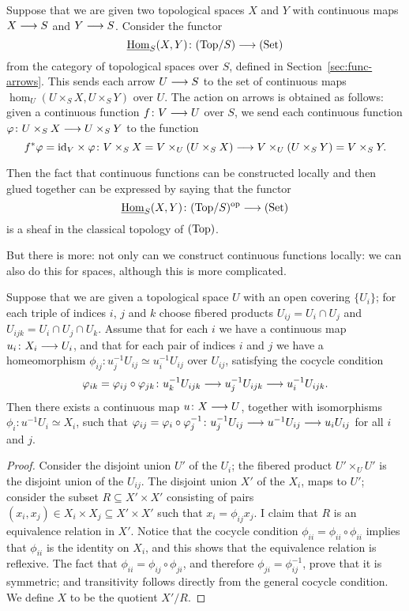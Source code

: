 \begin{4   STACKS}
\begin{4.1 Descent of objects of fibcats}
Suppose that we are given two topological spaces $X$ and $Y$ with continuous maps $X \arr S$ and $Y \arr S$. Consider the functor
   \[
   \underhom_S(X, Y) \colon \catover{Top}{S} \arr \catset
   \]
from the category of topological spaces over $S$, defined in Section~\ref{sec:func-arrows}. This sends each arrow $U \arr S$ to the set of continuous maps $\hom_U(U \times_S X, U \times_S Y)$ over $U$. The action on arrows is obtained as follows: given a continuous function $f \colon V \arr U$ over $S$, we send each continuous function $\phi \colon U \times_S X \arr U \times_S Y$ to the function
   \[
   f^* \phi = \id_V \times \phi \colon V
   \times_S X = V \times_U(U \times_S X) \arr V \times_U(U
   \times_S Y) = V \times_S Y.
   \]

Then the fact that continuous functions can be constructed locally and then glued together can be expressed by saying that the functor
   \[
   \underhom_S(X, Y) \colon \catover{Top}{S}
   \op \arr \catset
   \]
is a sheaf in the classical topology of $(\mathrm{Top})$.

But there is more: not only can we construct continuous functions locally: we can also do this for spaces, although this is more complicated.

\begin{proposition}\label{prop:gluing-top}
Suppose that we are given a topological space $U$ with an open covering $\{U_i\}$; for each triple of indices $i$, $j$ and $k$ choose fibered products $U_{ij} = U_i \cap U_j$ and $U_{ijk} = U_i \cap U_j \cap U_k$. Assume that for each $i$ we have a continuous map $u_i \colon X_i \arr U_i$, and that for each pair of indices $i$ and $j$ we have a homeomorphism $\phi_{ij} \colon u_j^{-1}U_{ij} \simeq u_i^{-1}U_{ij}$ over $U_{ij}$, satisfying the cocycle condition
   \[
   \phi_{ik} = \phi_{ij} \circ \phi_{jk} \colon 
   u_k^{-1}U_{ijk} \arr 
   u_j^{-1}U_{ijk} \arr
   u_i^{-1}U_{ijk}.
   \]
Then there exists a continuous map $u \colon X \arr U$, together with isomorphisms $\phi_i \colon u^{-1} U_i \simeq X_i$, such that $\phi_{ij} = \phi_i \circ \phi_j^{-1} \colon u_j^{-1}U_{ij} \arr u^{-1}U_{ij} \arr u_iU_{ij}$ for all $i$ and $j$.
\end{proposition}

\begin{proof}
Consider the disjoint union $U'$ of the $U_i$; the fibered product $U' \times_U U'$ is the disjoint union of the $U_{ij}$. The disjoint union $X'$ of the $X_i$, maps to $U'$; consider the subset $R \subseteq X' \times X'$ consisting of pairs $(x_i, x_j) \in X_i \times X_j \subseteq X' \times X'$ such that $x_i = \phi_{ij} x_j$. I claim that $R$ is an equivalence relation in $X'$. Notice that the cocycle condition $\phi_{ii} = \phi_{ii} \circ \phi_{ii}$ implies that $\phi_{ii}$ is the identity on $X_i$, and this shows that the equivalence relation is reflexive. The fact that $\phi_{ii} = \phi_{ij} \circ \phi_{ji}$, and therefore $\phi_{ji} = \phi_{ij}^{-1}$, prove that it is symmetric; and transitivity follows directly from the general cocycle condition. We define $X$ to be the quotient $X'/R$.


\end{proof}
\end{4.1 Descent of objects of fibcats}
\end{4   STACKS}
